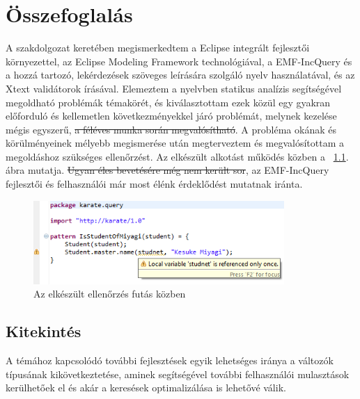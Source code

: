 \chapter{Összefoglalás}

A szakdolgozat keretében megismerkedtem a Eclipse integrált fejlesztői környezettel, 
az Eclipse Modeling Framework technológiával, a EMF-IncQuery és a hozzá tartozó, lekérdezések szöveges leírására szolgáló nyelv használatával, és az Xtext validátorok írásával.
Elemeztem a nyelvben statikus analízis segítségével megoldható problémák témakörét, és kiválasztottam ezek közül egy gyakran előforduló és kellemetlen következményekkel járó problémát, melynek kezelése mégis egyszerű, \sout{a féléves munka során megvalósítható}.
A probléma okának és körülményeinek mélyebb megismerése után megterveztem és megvalósítottam a megoldáshoz szükséges ellenőrzést.
Az elkészült alkotást működés közben a ~\ref{fig:unusedLive}. ábra mutatja.
\sout{Ugyan éles bevetésére még nem került sor}, az EMF-IncQuery fejlesztői és felhasználói már most élénk érdeklődést mutatnak iránta.
\begin{figure}[h]
\centering
\includegraphics[width=0.85\textwidth]{figures/unused-variable-detection-warning.png}
\caption{Az elkészült ellenőrzés futás közben}
\label{fig:unusedLive}
\end{figure}

\section{Kitekintés}
A témához kapcsolódó további fejlesztések egyik lehetséges iránya a változók tí\-pu\-sá\-nak 
kikövetkeztetése, aminek segítségével további felhasználói mulasztások kerülhetőek el és akár a 
keresések optimalizálása is lehetővé válik.
